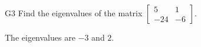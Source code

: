 \begin{problem}{G3}
Find the eigenvalues of the matrix \(\begin{bmatrix} 5 & 1 \\ -24 & -6\end{bmatrix}\).
\end{problem}
\begin{solution}
The eigenvalues are \(-3\) and \(2\).
\end{solution}

